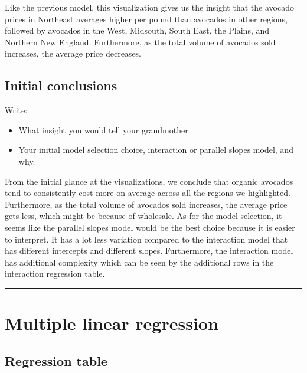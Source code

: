 \documentclass[
]{article}
\providecommand{\tightlist}{%
  \setlength{\itemsep}{0pt}\setlength{\parskip}{0pt}}
\begin{document}
Like the previous model, this visualization gives us the insight that
the avocado prices in Northeast averages higher per pound than avocados
in other regions, followed by avocados in the West, Midsouth, South
East, the Plains, and Northern New England. Furthermore, as the total
volume of avocados sold increases, the average price decreases.

\hypertarget{initial-conclusions}{%
\subsection{Initial conclusions}\label{initial-conclusions}}

Write:

\begin{itemize}
\tightlist
\item
  What insight you would tell your grandmother
\item
  Your initial model selection choice, interaction or parallel slopes
  model, and why.
\end{itemize}

From the initial glance at the visualizations, we conclude that organic
avocados tend to consistently cost more on average across all the
regions we highlighted. Furthermore, as the total volume of avocados
sold increases, the average price gets less, which might be because of
wholesale. As for the model selection, it seems like the parallel slopes
model would be the best choice because it is easier to interpret. It has
a lot less variation compared to the interaction model that has
different intercepts and different slopes. Furthermore, the interaction
model has additional complexity which can be seen by the additional rows
in the interaction regression table.

\begin{center}\rule{0.5\linewidth}{0.5pt}\end{center}

\hypertarget{multiple-linear-regression}{%
\section{Multiple linear regression}\label{multiple-linear-regression}}

\hypertarget{regression-table}{%
\subsection{Regression table}\label{regression-table}}
\end{document}
